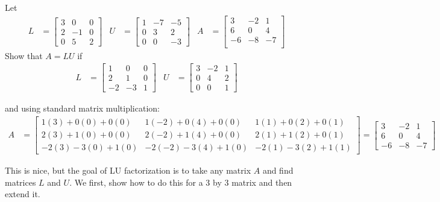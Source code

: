 \begin{example}
Let 
\begin{align*}
L & = \begin{bmatrix}
3 & 0 & 0 \\
2 & -1 & 0 \\
0 & 5 & 2
\end{bmatrix} & 
U & = \begin{bmatrix}
1 & -7 & -5 \\
0 & 3 & 2 \\
0 & 0 & -3 
\end{bmatrix} & 
 A &= \begin{bmatrix}
  3 & -2 &  1 \\
  6 &  0 &  4 \\
 -6 & -8 & -7 \\
\end{bmatrix}
\end{align*}
Show that $A=LU$ if
\begin{align*}
L &= \begin{bmatrix}
1 & 0 & 0 \\ 2 & 1 & 0 \\ -2 & -3 & 1 
\end{bmatrix}
& U & = \begin{bmatrix}
3 & -2 & 1 \\
0 & 4 & 2 \\
0 & 0 & 1
\end{bmatrix}
\end{align*}

and using standard matrix multiplication:
\begin{align*}
A & = \begin{bmatrix}
1(3)+0(0)+0(0) & 1(-2) +0(4)+0(0) & 1(1)+0(2)+0(1) \\
2(3)+1(0)+0(0) & 2(-2)+1(4)+0(0) & 2(1)+1(2)+0(1) \\
-2(3)-3(0)+1(0) & -2(-2)-3(4)+1(0)&-2(1)-3(2)+1(1) 
\end{bmatrix} =
\begin{bmatrix}
3 & -2 & 1 \\ 6 & 0 & 4 \\ -6 & -8 & -7
\end{bmatrix}
\end{align*}


\end{example}

This is nice, but the goal of LU factorization is to take any matrix $A$ and find matrices $L$ and $U$.  We first, show how to do this for a 3 by 3 matrix and then extend it. 

